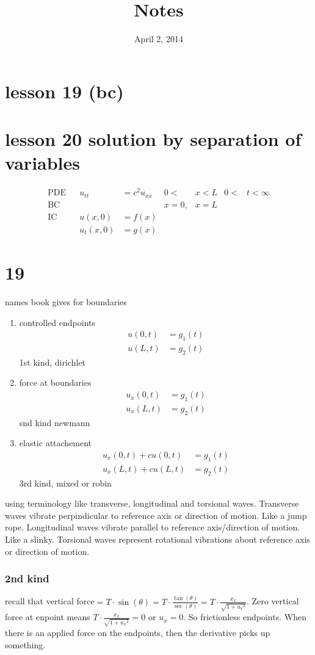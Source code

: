 \documentclass{article}
\begin{document}
\title{Notes}
\date{April 2, 2014}
\maketitle
\section*{lesson 19 (bc)}
\section*{lesson 20 solution by separation of variables}
\begin{align*}
  \text{PDE}&&u_{tt}&=c^2u_{xx}&0<&x<L&0<&t<\infty\\
  \text{BC}&&&&x=0,&x=L\\
  \text{IC}&&u(x,0)&=f(x)\\
  &&u_t(x,0)&=g(x)
\end{align*}
\section*{19}
names book gives for boundaries
\begin{enumerate}
\item
controlled endpoints
\begin{align*}
  u(0,t)&=g_1(t)\\
  u(L,t)&=g_2(t)
\end{align*}
1st kind, dirichlet
\item
force at boundaries
\begin{align*}
  u_x(0,t)&=g_1(t)\\
  u_x(L,t)&=g_2(t)
\end{align*}
snd kind newmann
\item
elastic attachement
\begin{align*}
  u_x(0,t)+cu(0,t)&=g_1(t)\\
  u_x(L,t)+cu(L,t)&=g_2(t)
\end{align*}
3rd kind, mixed or robin
\end{enumerate}
using terminology like transverse, longitudinal and torsional waves.
Transverse waves vibrate perpindicular to reference axis or direction of motion. Like a jump rope.
Longitudinal waves vibrate parallel to reference axis/direction of motion. Like a slinky.
Torsional waves represent rotational vibrations about reference axis or direction of motion.

\subsubsection*{2nd kind}
recall that vertical force$=T\cdot\sin(\theta)=T\cdot\frac{\tan(\theta)}{\sec(\theta)}=T\cdot\frac{x_x}{\sqrt{1+{u_x}^2}}$. Zero vertical force at enpoint means $T\cdot\frac{x_x}{\sqrt{1+{u_x}^2}}=0$ or $u_x=0$. So frictionless endpoints. When there is an applied force on the endpoints, then the derivative picks up something.
\end{document}
